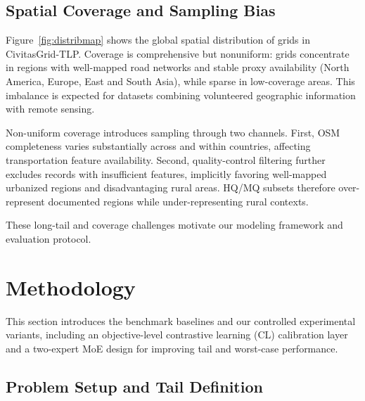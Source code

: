 \documentclass[11pt,conference,onecolumn]{IEEEtran}
\begin{document}
\subsection{Spatial Coverage and Sampling Bias}

Figure~\ref{fig:distribmap} shows the global spatial distribution of grids in CivitasGrid-TLP. Coverage is comprehensive but nonuniform: grids concentrate in regions with well-mapped road networks and stable proxy availability (North America, Europe, East and South Asia), while sparse in low-coverage areas. This imbalance is expected for datasets combining volunteered geographic information with remote sensing.

Non-uniform coverage introduces sampling through two channels. First, OSM completeness varies substantially across and within countries, affecting transportation feature availability. Second, quality-control filtering further excludes records with insufficient features, implicitly favoring well-mapped urbanized regions and disadvantaging rural areas. HQ/MQ subsets therefore over-represent documented regions while under-representing rural contexts.

These long-tail and coverage challenges motivate our modeling framework and evaluation protocol.

\section{Methodology}
This section introduces the benchmark baselines and our controlled experimental variants, including an objective-level contrastive learning (CL) calibration layer and a two-expert MoE design for improving tail and worst-case performance.

\subsection{Problem Setup and Tail Definition}
\label{sec:problem_setup}
\end{document}
